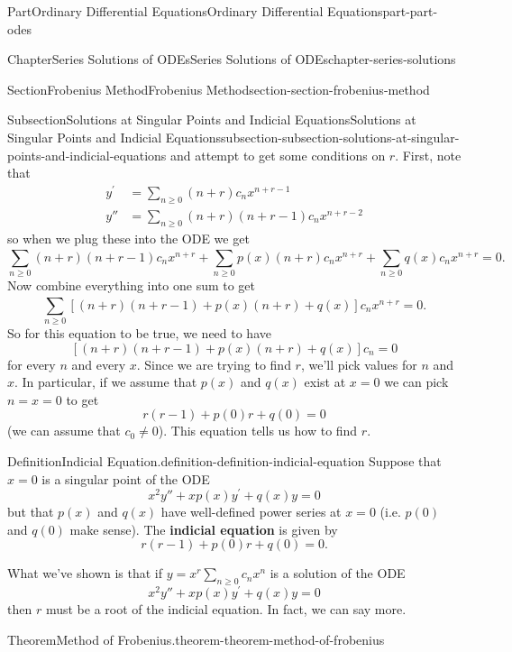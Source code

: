 \documentclass[twoside,10pt,]{book}
\newcommand{\terminology}[1]{\textbf{#1}}
\numberwithin{equation}{part}
\begin{document}
\begin{partptx}{Part}{Ordinary Differential Equations}{}{Ordinary Differential Equations}{}{}{part-part-odes}
\begin{chapterptx}{Chapter}{Series Solutions of ODEs}{}{Series Solutions of ODEs}{}{}{chapter-series-solutions}
\begin{sectionptx}{Section}{Frobenius Method}{}{Frobenius Method}{}{}{section-section-frobenius-method}
\begin{subsectionptx}{Subsection}{Solutions at Singular Points and Indicial Equations}{}{Solutions at Singular Points and Indicial Equations}{}{}{subsection-subsection-solutions-at-singular-points-and-indicial-equations}
and attempt to get some conditions on \(r\). First, note that%
\begin{align*}
y^\prime &= \sum_{n\geq0}^{}(n+r)c_{n}x^{n+r-1}\\
y'' &= \sum_{n\geq0}^{}(n+r)(n+r-1)c_{n}x^{n+r-2}
\end{align*}
so when we plug these into the ODE we get%
\begin{equation*}
\sum_{n\geq0}^{}(n+r)(n+r-1)c_{n}x^{n+r}+\sum_{n\geq0}^{}p(x)(n+r)c_{n}x^{n+r}+\sum_{n\geq0}^{}q(x)c_{n}x^{n+r} = 0.
\end{equation*}
Now combine everything into one sum to get%
\begin{equation*}
\sum_{n\geq0}^{}\left[(n+r)(n+r-1)+p(x)(n+r)+q(x)\right]c_{n}x^{n+r} = 0.
\end{equation*}
So for this equation to be true, we need to have%
\begin{equation*}
\left[(n+r)(n+r-1)+p(x)(n+r)+q(x)\right]c_{n} = 0
\end{equation*}
for every \(n\) and every \(x\). Since we are trying to find \(r\), we'll pick values for \(n\) and \(x\). In particular, if we assume that \(p(x)\) and \(q(x)\) exist at \(x=0\) we can pick \(n=x=0\) to get%
\begin{equation*}
r(r-1)+p(0)r+q(0) = 0
\end{equation*}
(we can assume that \(c_{0}\neq0\)). This equation tells us how to find \(r\).%
\begin{definition}{Definition}{Indicial Equation.}{definition-definition-indicial-equation}%
%
Suppose that \(x=0\) is a singular point of the ODE%
\begin{equation*}
x^{2}y''+xp(x)y^\prime+q(x)y=0
\end{equation*}
but that \(p(x)\) and \(q(x)\) have well-defined power series at \(x=0\) (i.e. \(p(0)\) and \(q(0)\) make sense). The \terminology{indicial equation} is given by%
\begin{equation*}
r(r-1)+p(0)r+q(0) = 0.
\end{equation*}
%
\end{definition}
What we've shown is that if \(y=x^{r}\sum_{n\geq0}^{}c_{n}x^{n}\) is a solution of the ODE%
\begin{equation*}
x^{2}y''+xp(x)y^\prime+q(x)y=0
\end{equation*}
then \(r\) must be a root of the indicial equation. In fact, we can say more.%
\begin{theorem}{Theorem}{Method of Frobenius.}{}{theorem-theorem-method-of-frobenius}%

\end{theorem}
\end{subsectionptx}
\end{sectionptx}
\end{chapterptx}
\end{partptx}
\end{document}
